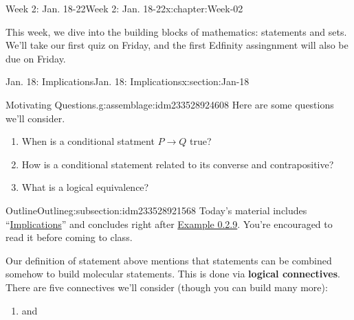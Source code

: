\documentclass[oneside,10pt,]{book}
\newcommand{\terminology}[1]{\textbf{#1}}
\numberwithin{equation}{section}
\begin{document}
%
%
\typeout{************************************************}
\typeout{************************************************}
%
\begin{chapterptx}{Week 2: Jan. 18-22}{}{Week 2: Jan. 18-22}{}{}{x:chapter:Week-02}
\begin{introduction}{}%
This week, we dive into the building blocks of mathematics: statements and sets. We'll take our first quiz on Friday, and the first Edfinity assingnment will also be due on Friday.%
\end{introduction}%
%
%
\typeout{************************************************}
\typeout{************************************************}
%
\begin{sectionptx}{Jan. 18: Implications}{}{Jan. 18: Implications}{}{}{x:section:Jan-18}
\begin{introduction}{}%
\begin{assemblage}{Motivating Questions.}{g:assemblage:idm233528924608}%
Here are some questions we'll consider. %
\begin{enumerate}
\item{}When is a conditional statment \(P\to Q\) true?%
\item{}How is a conditional statement related to its converse and contrapositive?%
\item{}What is a logical equivalence?%
\end{enumerate}
%
\end{assemblage}
\end{introduction}%
%
%
\typeout{************************************************}
\typeout{************************************************}
%
\begin{subsectionptx}{Outline}{}{Outline}{}{}{g:subsection:idm233528921568}
Today's material includes ``\href{http://discrete.openmathbooks.org/dmoi3/sec_intro-statements.html\#cRv}{Implications}'' and concludes right after \href{http://discrete.openmathbooks.org/dmoi3/sec_intro-statements.html\#vET}{Example 0.2.9}. You're encouraged to read it before coming to class.%
\par
Our definition of statement above mentions that statements can be combined somehow to build molecular statements. This is done via \terminology{logical connectives}. There are five connectives we'll consider (though you can build many more):%
%
\begin{enumerate}
\item{}and%

\end{enumerate}
\end{subsectionptx}
\end{sectionptx}
\end{chapterptx}
\end{document}
